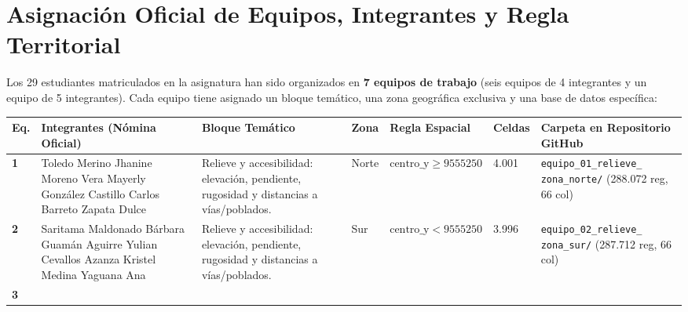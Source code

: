 \documentclass[11pt,a4paper]{article}
\begin{document}
\section{Asignación Oficial de Equipos, Integrantes y Regla Territorial}

Los 29 estudiantes matriculados en la asignatura han sido organizados en \textbf{7 equipos de trabajo} (seis equipos de 4 integrantes y un equipo de 5 integrantes). Cada equipo tiene asignado un bloque temático, una zona geográfica exclusiva y una base de datos específica:

\begin{table}[h!]
\centering
\scriptsize
\renewcommand{\arraystretch}{1.03}
\begin{tabularx}{\textwidth}{C{0.8cm} L{3.5cm} L{3.3cm} C{1.1cm} C{1.8cm} C{1.1cm} Y}
\toprule
\textbf{Eq.} & \textbf{Integrantes (Nómina Oficial)} & \textbf{Bloque Temático} & \textbf{Zona} & \textbf{Regla Espacial} & \textbf{Celdas} & \textbf{Carpeta en Repositorio GitHub} \\
\midrule
\textbf{1} & 
\textbullet{} Toledo Merino Jhanine\newline
\textbullet{} Moreno Vera Mayerly\newline
\textbullet{} González Castillo Carlos\newline
\textbullet{} Barreto Zapata Dulce & 
Relieve y accesibilidad: elevación, pendiente, rugosidad y distancias a vías/poblados. & 
Norte & 
$\text{centro\_y} \ge 9555250$ & 
4.001 & 
\texttt{equipo\_01\_relieve\_} \newline \texttt{zona\_norte/} \newline (288.072 reg, 66 col) \\
\midrule
\textbf{2} & 
\textbullet{} Saritama Maldonado Bárbara\newline
\textbullet{} Guamán Aguirre Yulian\newline
\textbullet{} Cevallos Azanza Kristel\newline
\textbullet{} Medina Yaguana Ana & 
Relieve y accesibilidad: elevación, pendiente, rugosidad y distancias a vías/poblados. & 
Sur & 
$\text{centro\_y} < 9555250$ & 
3.996 & 
\texttt{equipo\_02\_relieve\_} \newline \texttt{zona\_sur/} \newline (287.712 reg, 66 col) \\
\midrule
\textbf{3} & 

\end{tabularx}
\end{table}
\end{document}
